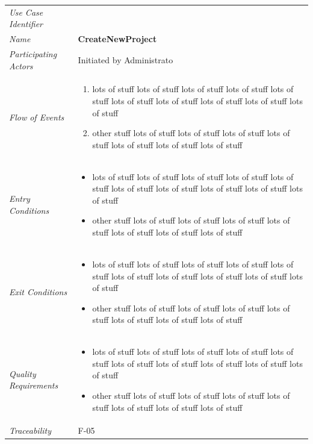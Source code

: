 \documentclass[12pt,letterpaper]{article}
\begin{document}
\begin{center}
	\begin{tabu} to 
		\toprule
		Use Case Identifier & \createnewproject{} \\
		Name & {\bf CreateNewProject} \\
		Participating Actors & Initiated by Administrato \\
		Flow of Events & 
	    \begin{enumerate}[topsep=-1em]
		    \item lots of stuff lots of stuff lots of stuff lots of stuff lots of stuff lots of stuff lots of stuff lots of stuff lots of stuff lots of stuff
		    \item other stuff lots of stuff lots of stuff lots of stuff lots of stuff lots of stuff lots of stuff lots of stuff
		\end{enumerate} \\

		Entry Conditions &
		\begin{itemize}[topsep=-1em]
		    \item lots of stuff lots of stuff lots of stuff lots of stuff lots of stuff lots of stuff lots of stuff lots of stuff lots of stuff lots of stuff
		    \item other stuff lots of stuff lots of stuff lots of stuff lots of stuff lots of stuff lots of stuff lots of stuff
        \end{itemize} \\

		Exit Conditions &
		\begin{itemize}[topsep=-1em]
		    \item lots of stuff lots of stuff lots of stuff lots of stuff lots of stuff lots of stuff lots of stuff lots of stuff lots of stuff lots of stuff
		    \item other stuff lots of stuff lots of stuff lots of stuff lots of stuff lots of stuff lots of stuff lots of stuff
        \end{itemize} \\

		Quality Requirements &
		\begin{itemize}[topsep=-1em]
		    \item lots of stuff lots of stuff lots of stuff lots of stuff lots of stuff lots of stuff lots of stuff lots of stuff lots of stuff lots of stuff
		    \item other stuff lots of stuff lots of stuff lots of stuff lots of stuff lots of stuff lots of stuff lots of stuff
        \end{itemize} \\

		Traceability & F-05 \\
		\toprule
	\end{tabu}
\end{center}
\end{document}
